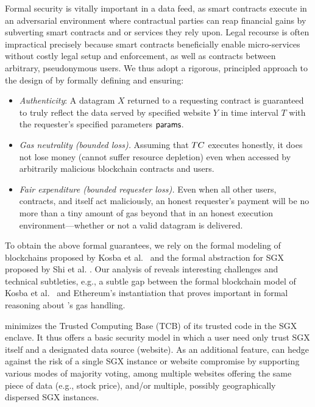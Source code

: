 \vspace{2mm}
Formal security is vitally important in a data feed, as  smart contracts execute in an adversarial environment
where contractual parties can reap financial gains by subverting smart contracts and or services they rely upon.
Legal recourse is often impractical precisely because smart contracts beneficially enable micro-services without costly legal setup and enforcement, as well as contracts between arbitrary, pseudonymous users. We thus adopt a rigorous, principled approach to the design of \tcs by formally defining and ensuring: 

\vspace{-1mm}
\begin{itemize}[leftmargin=5mm]
\item
  \setlength{\itemsep}{2pt}
  \setlength{\parskip}{0pt}
  \setlength{\parsep}{0pt}
{\it Authenticity}: A datagram $X$ returned
to a requesting contract is guaranteed
to truly reflect the data served by specified website $Y$ in time interval $T$ with the requester's specified parameters ${\sf params}$.
\item
{\it Gas neutrality (bounded \tc loss).} Assuming that $TC$ executes honestly, it does not lose money (cannot suffer resource depletion)
even when accessed by arbitrarily malicious blockchain contracts and users.
\item
{\it Fair expenditure (bounded requester loss).} 
Even when all other users, contracts, and \tc itself 
act maliciously, 
an honest requester's payment will be no more than a tiny amount of gas beyond that in an honest execution environment---whether or not a valid datagram is delivered.
\end{itemize}
\vspace{-1mm}

To obtain the above formal guarantees,
we rely on the formal modeling 
of blockchains proposed by Kosba et al.~\cite{hawk} and the formal abstraction for SGX proposed by Shi et al. .
Our analysis of \tc reveals interesting challenges and technical subtleties, e.g., 
a subtle gap between the formal blockchain model
of Kosba et al.~\cite{hawk}
and Ethereum's instantiation  
that proves important in formal reasoning about \tc's
gas handling. 

\vspace{2mm}
\tc minimizes the Trusted Computing Base (TCB) of its trusted code in the SGX enclave.
It thus offers a basic security model in which a user need only trust SGX itself and a designated data source (website).
As an additional feature, \tc can hedge against the risk of a single SGX instance
or website compromise by supporting
various modes of majority voting, 
among multiple 
websites offering the same piece of data (e.g., stock price),  
and/or multiple, possibly geographically dispersed SGX instances.


